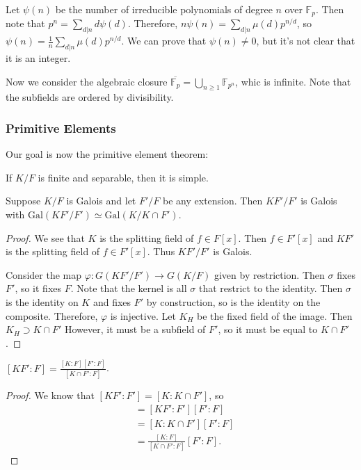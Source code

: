 \documentclass[10pt, twoside]{article}
\newcommand{\F}{\mathbb{F}}
\begin{document}
        Let $\psi(n)$ be the number of irreducible polynomials of degree $n$
        over $\F_p$. Then note that $p^n = \sum_{d|n} d\psi(d)$. Therefore,
        $n\psi(n) = \sum_{d|n}\mu(d)p^{n/d}$, so $\psi(n) = \frac{1}{n}
        \sum_{d|n} \mu(d)p^{n/d}$. We can prove that $\psi(n) \neq 0$, but it's
        not clear that it is an integer.

        Now we consider the algebraic closure $\overline{\F_p} = \bigcup_{n
        \geq 1} \F_{p^n}$, whic is infinite. Note that the subfields are
        ordered by divisibility.

        \subsubsection{Primitive Elements}

        Our goal is now the primitive element theorem: \begin{thm} If $K/F$ is
        finite and separable, then it is simple.  \end{thm}

        \begin{prop} Suppose $K/F$ is Galois and let $F'/F$ be any extension.
            Then $KF'/F'$ is Galois with $\mathrm{Gal}(KF'/F') \simeq
            \mathrm{Gal}(K/K\cap F')$.  \begin{proof} We see that $K$ is the
                splitting field of $f \in F[x]$. Then $f \in F'[x]$ and $KF'$
                is the splitting field of $f \in F'[x]$. Thus $KF'/F'$ is
                Galois.

                Consider the map $\varphi: G(KF'/F') \to G(K/F)$ given by
            restriction. Then $\sigma$ fixes $F'$, so it fixes $F$. Note that
        the kernel is all $\sigma$ that restrict to the identity. Then $\sigma$
    is the identity on $K$ and fixes $F'$ by construction, so is the identity
on the composite. Therefore, $\varphi$ is injective. Let $K_H$ be the fixed
field of the image. Then $K_H \supset K \cap F'$ However, it must be a subfield
of $F'$, so it must be equal to $K \cap F'$.  \end{proof} \end{prop}

        \begin{cor} $[KF':F] = \frac{[K:F][F':F]}{[K\cap F':F]}$.
            \begin{proof} We know that $[KF':F'] = [K:K\cap F']$, so
                \begin{align*} [KF':F] &= [KF':F'][F':F] \\ &= [K:K\cap
                F'][F':F] \\ &= \frac{[K:F]}{[K \cap F':F]} [F':F].
            \end{align*} \end{proof} \end{cor}
\end{document}
